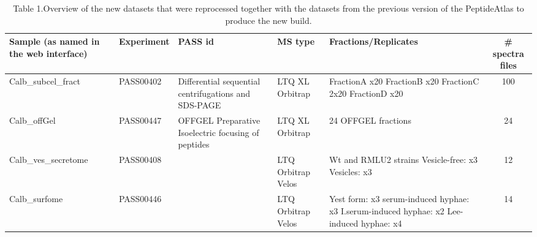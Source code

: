 \begin{table}[t]
\renewcommand{\arraystretch}{1.5}
\footnotesize
\centering
\begin{tabular}{p{2cm} p{1cm} p{2cm} p{1cm} p{2cm} c }
\hline
Sample \newline (as named in \newline the web interface) & Experiment & PASS id & MS type & Fractions/Replicates & \# spectra files\\
\hline
Calb\_subcel\_fract & PASS00402 & Differential \newline sequential \newline centrifugations \newline and \newline SDS-PAGE &  LTQ XL \newline Orbitrap & FractionA x20 \newline FractionB x20 \newline FractionC 2x20  \newline FractionD x20  & 100\\
Calb\_offGel & PASS00447 & OFFGEL \newline Preparative \newline Isoelectric \newline focusing \newline of peptides &  LTQ XL \newline Orbitrap & 24 OFFGEL fractions & 24\\
Calb\_ves\_secretome & PASS00408 & \citep{Gil-Bona2015a} & LTQ \newline Orbitrap \newline Velos & Wt and RMLU2 strains \newline Vesicle-free: x3 \newline Vesicles: x3 & 12\\
Calb\_surfome & PASS00446 & \citep{Gil-Bona2015} & LTQ \newline Orbitrap \newline Velos & Yest form: x3 \newline serum-induced hyphae: x3 \newline I.serum-induced hyphae: x2 \newline Lee-induced hyphae: x4 & 14\\

\end{tabular}
\caption*{Table 1.Overview of the new datasets that were reprocessed together with the datasets from the previous version of the PeptideAtlas to produce the
new build.}
\end{table}


